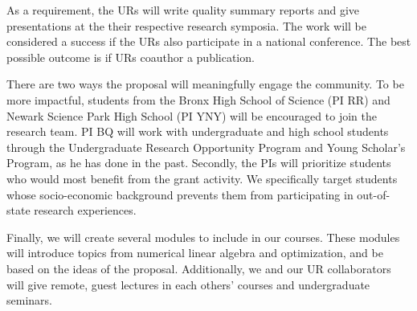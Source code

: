 As a requirement, the URs will write quality summary reports and give
presentations at the their respective research symposia. The work will
be considered a success if the URs also participate in a national
conference. The best possible outcome is if URs coauthor a publication.

There are two ways the proposal will meaningfully engage the community.
To be more impactful, students from the Bronx High School of Science (PI
RR) and Newark Science Park High School (PI YNY) will be encouraged to
join the research team. PI BQ will work with undergraduate and high
school students through the Undergraduate Research Opportunity Program
and Young Scholar's Program, as he has done in the past. Secondly, the
PIs will prioritize students who would most benefit from the grant
activity. We specifically target students whose socio-economic
background prevents them from participating in out-of-state research
experiences. 

Finally, we will create several modules to include in our courses. These
modules will introduce topics from numerical linear algebra and
optimization, and be based on the ideas of the proposal. Additionally,
we and our UR collaborators will give remote, guest lectures in each
others' courses and undergraduate seminars. 




